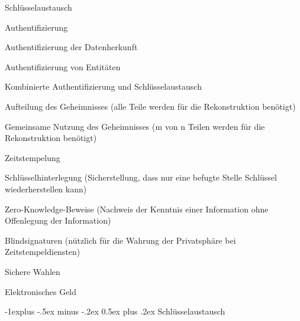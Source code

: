 \documentclass[a4paper]{article}
\makeatletter
\renewcommand{\subsection}{\@startsection{subsection}{2}{0mm}%
 {-1explus -.5ex minus -.2ex}%
 {0.5ex plus .2ex}%
 {\normalfont\normalsize\bfseries}}
\makeatother
\begin{document}
\begin{multicols}{3}
      \begin{itemize*}
            \item Schlüsselaustausch
            \item Authentifizierung
            \begin{itemize*}
                  \item Authentifizierung der Datenherkunft
                  \item Authentifizierung von Entitäten
            \end{itemize*}
            \item Kombinierte Authentifizierung und Schlüsselaustausch
            \item Aufteilung des Geheimnisses (alle Teile werden für die Rekonstruktion
            benötigt)
            \item Gemeinsame Nutzung des Geheimnisses (m von n Teilen werden für die
            Rekonstruktion benötigt)
            \item Zeitstempelung
            \item Schlüsselhinterlegung (Sicherstellung, dass nur eine befugte Stelle
            Schlüssel wiederherstellen kann)
            \item Zero-Knowledge-Beweise (Nachweis der Kenntnis einer Information ohne
            Offenlegung der Information)
            \item Blindsignaturen (nützlich für die Wahrung der Privatsphäre bei
            Zeitstempeldiensten)
            \item Sichere Wahlen
            \item Elektronisches Geld
      \end{itemize*}


      \subsection{Schlüsselaustausch}


\end{multicols}
\end{document}
